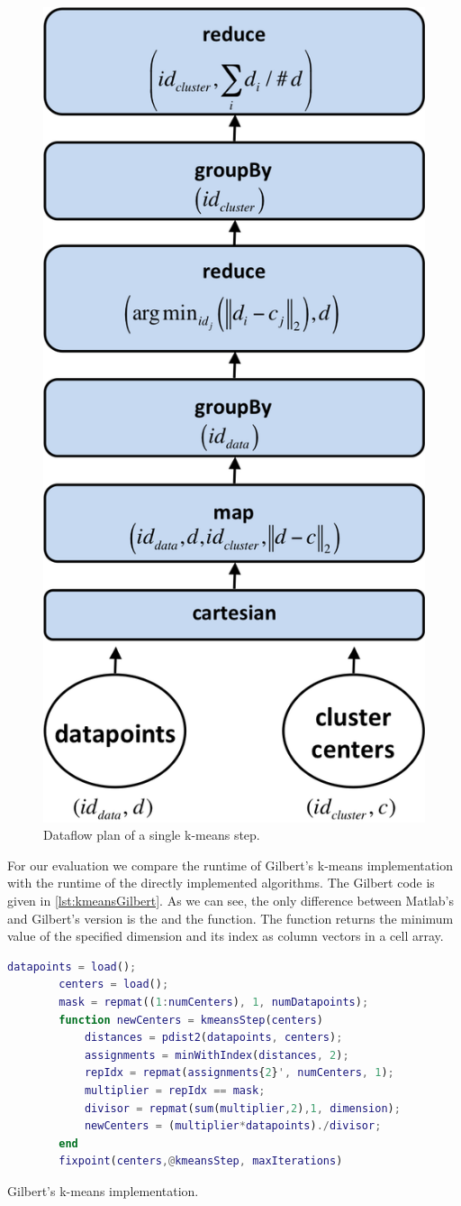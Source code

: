 \begin{figure}[h!]
	\centering
	\includegraphics[width=0.3\linewidth]{images/kmeansStep.png}
	\caption{Dataflow plan of a single k-means step.}
	\label{fig:kmeansDataflow}
\end{figure}

For our evaluation we compare the runtime of Gilbert's k-means implementation with the runtime of the directly implemented algorithms.
The Gilbert code is given in \cref{lst:kmeansGilbert}.
As we can see, the only difference between Matlab's and Gilbert's version is the  and the  function.
The  function returns the minimum value of the specified dimension and its index as column vectors in a cell array.

\begin{listing}[!h]
	\begin{CenteredBox}
		\begin{lstlisting}[language=Matlab]
		datapoints = load();
		centers = load();
		mask = repmat((1:numCenters), 1, numDatapoints);
		function newCenters = kmeansStep(centers)
  			distances = pdist2(datapoints, centers);
		  	assignments = minWithIndex(distances, 2);
		  	repIdx = repmat(assignments{2}', numCenters, 1);
		  	multiplier = repIdx == mask;
		  	divisor = repmat(sum(multiplier,2),1, dimension);
		  	newCenters = (multiplier*datapoints)./divisor;
		end
		fixpoint(centers,@kmeansStep, maxIterations)
		\end{lstlisting}
	\end{CenteredBox}
	\caption{Gilbert's k-means implementation.}
	\label{lst:kmeansGilbert}
\end{listing}

